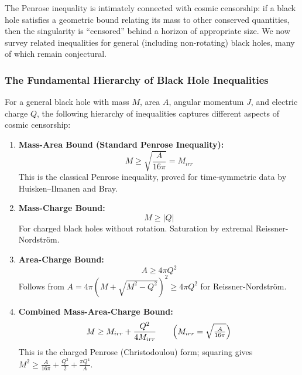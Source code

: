 The Penrose inequality is intimately connected with cosmic censorship: if a black hole satisfies a geometric bound relating its mass to other conserved quantities, then the singularity is ``censored'' behind a horizon of appropriate size. We now survey related inequalities for general (including non-rotating) black holes, many of which remain conjectural.

\subsubsection{The Fundamental Hierarchy of Black Hole Inequalities}

For a general black hole with mass $M$, area $A$, angular momentum $J$, and electric charge $Q$, the following hierarchy of inequalities captures different aspects of cosmic censorship:

\begin{enumerate}[label=(\Roman*)]
    \item \textbf{Mass-Area Bound (Standard Penrose Inequality):}
    \begin{equation}\label{eq:mass-area}
    M \geq \sqrt{\frac{A}{16\pi}} = M_{irr}
    \end{equation}
    This is the classical Penrose inequality, proved for time-symmetric data by Huisken--Ilmanen and Bray.
    
    \item \textbf{Mass-Charge Bound:}
    \begin{equation}\label{eq:mass-charge}
    M \geq |Q|
    \end{equation}
    For charged black holes without rotation. Saturation by extremal Reissner-Nordstr\"om.
    
    \item \textbf{Area-Charge Bound:}
    \begin{equation}\label{eq:area-charge}
    A \geq 4\pi Q^2
    \end{equation}
    Follows from $A = 4\pi(M + \sqrt{M^2 - Q^2})^2 \geq 4\pi Q^2$ for Reissner-Nordstr\"om.
    
    \item \textbf{Combined Mass-Area-Charge Bound:}
    \begin{equation}\label{eq:mass-area-charge}
    M \geq M_{irr} + \frac{Q^2}{4M_{irr}} \qquad \Bigl(M_{irr}=\sqrt{\tfrac{A}{16\pi}}\Bigr)
    \end{equation}
    This is the charged Penrose (Christodoulou) form; squaring gives
    $M^2 \geq \tfrac{A}{16\pi} + \tfrac{Q^2}{2} + \tfrac{\pi Q^4}{A}$.
\end{enumerate}

